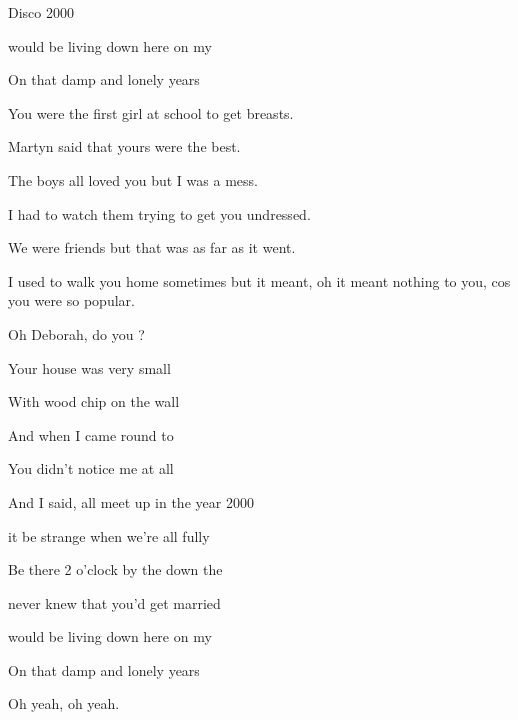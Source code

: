 \begin{song}{Disco 2000}{
	
	\chordset[Intro]{ \FMaj \FMajsusFour \BMaj \BMajsusFour }	
	
	\chordset[Verse]{ \FMaj \BFlat }

	\chordset[Chorus]{ \Cm \BFlat \Dm \Gm \FMaj }
	
}
\begin{songverse}
		 would be living down here on my    

		On that damp and lonely  years  
	\end{songverse}

	\begin{songverse}
		
		You were the first girl at school to get breasts.
		
		Martyn said that yours were the best.
		
		The boys all loved you but I was a mess.
		
		I had to watch them trying to get you undressed.
		
		We were friends but that was as far as it went.
		
		I used to walk you home sometimes but it meant,
		oh it meant nothing to you,
		cos you were so popular.
	\end{songverse}
	
	 \begin{songverse}	     
	                  
		Oh Deborah, do you ?

		Your house was very small

		With wood chip on the wall
                         
		And when I came round to 

		You didn't notice me at all 		
	 \end{songverse}

 \begin{songverse}
                          
		And I said,  all meet up in the year 2000
                                        
		 it be strange when we're all fully 
                                          
		Be there 2 o'clock by the  down the 

		 never knew that you'd get married 
                             
		 would be living down here on my    

		On that damp and lonely  years  
	\end{songverse}

		Oh yeah,
		oh yeah.
	
	 \begin{songverse}	     
	                  

\end{songverse}
\end{song}
